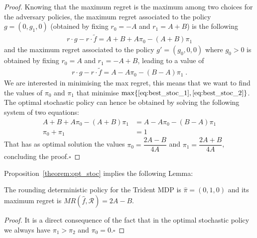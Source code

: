 \begin{proof}
Knowing that the maximum regret is the maximum among two choices for the adversary policies, the maximum regret associated to the policy $g =(0, g_1, 0)$ (obtained by fixing $r_0 = -A$ and $r_1 = A+B$) is the following
\vspace{-0.2cm}
\begin{align}
r \cdot g - r \cdot \tilde{f} = A + B +A \pi_0 -(A+B)\pi_1 \label{eq:best_stoc_1}
\end{align}   
and the maximum regret associated to the policy $g' = (g_0, 0, 0)$ where $g_0 > 0$ is obtained by fixing $r_0 = A$ and $r_1 = -A+B$, leading to a value of
\vspace{-0.2cm}
\begin{align}
r \cdot g - r \cdot \tilde{f}  = A - A \pi_0 -(B-A)\pi_1 \label{eq:best_stoc_2}\;.
\end{align}   
We are interested in minimising the max regret, this means that we want to find the values of $\pi_0$ and $\pi_1$ that minimise $\max \{\eqref{eq:best_stoc_1}, \eqref{eq:best_stoc_2}\}$. The optimal stochastic policy can hence be obtained by solving the following system of two equations: 
\vspace{-0.2cm}
\begin{align*}
A + B +A \pi_0 -(A+B)\pi_1 &= A - A \pi_0 -(B-A)\pi_1\\
\pi_0+\pi_1 &= 1
\end{align*} 
That has as optimal solution the values $\pi_{0}=\dfrac{2A - B}{4A}$ and $\pi_{1}=\dfrac{2A + B}{4A}$, concluding the proof.$\square$
\end{proof}


Proposition~\ref{theorem:opt_stoc} implies the following Lemma:
\begin{lemma}\label{lemma:heur_policy}
The rounding deterministic policy for the Trident MDP is $\hat{\pi} = (0, 1, 0)$ %
and its maximum regret is $MR(\hat{f}, \mathcal{R}) = 2A-B$.
\end{lemma}
\begin{proof}
It is a direct consequence of the fact that in the optimal stochastic policy we always have $\pi_1 > \pi_2$ and $\pi_0 = 0$.$\square$
\end{proof}

